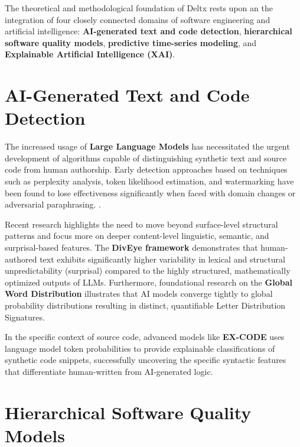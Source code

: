 
The theoretical and methodological foundation of Deltx rests upon an the integration of four closely connected domains of software engineering and artificial intelligence: \textbf{AI-generated text and code detection}, \textbf{hierarchical software quality models}, \textbf{predictive time-series modeling}, and \textbf{Explainable Artificial Intelligence (XAI)}.

\section{AI-Generated Text and Code Detection}

The increased usage of \textbf{Large Language Models} has necessitated the urgent development of algorithms capable of distinguishing synthetic text and source code from human authorship. Early detection approaches based on techniques such as perplexity analysis, token likelihood estimation, and watermarking have been found to lose effectiveness significantly when faced with domain changes or adversarial paraphrasing. \parencite{diversity_boosts_ai_generated_text_detection, why_ai_generated_text_detection_fails}.

Recent research highlights the need to move beyond surface-level structural patterns and focus more on deeper content-level linguistic, semantic, and surprisal-based features. The \textbf{DivEye framework} demonstrates that human-authored text exhibits significantly higher variability in lexical and structural unpredictability (surprisal) compared to the highly structured, mathematically optimized outputs of LLMs\parencite{diversity_boosts_ai_generated_text_detection}. Furthermore, foundational research on the \textbf{Global Word Distribution} illustrates that AI models converge tightly to global probability distributions resulting in distinct, quantifiable Letter Distribution Signatures\parencite{beyond_perplexity_character_distribution_signatures_mdta}. 

In the specific context of source code, advanced models like \textbf{EX-CODE} uses language model token probabilities to provide explainable classifications of synthetic code snippets, successfully uncovering the specific syntactic features that differentiate human-written from AI-generated logic\parencite{excode_robust_explainable_model_detect_ai_generated_code}.

\section{Hierarchical Software Quality Models}

